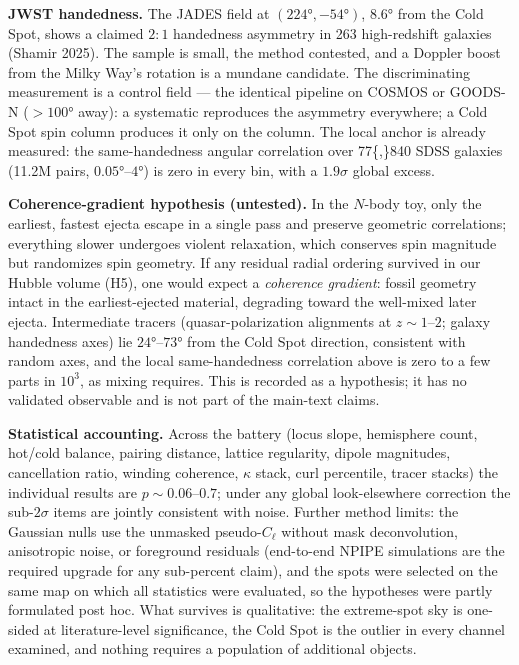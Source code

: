\documentclass[
]{article}
\begin{document}
\textbf{JWST handedness.} The JADES field at \((224°, -54°)\), \(8.6°\)
from the Cold Spot, shows a claimed \(2\!:\!1\) handedness asymmetry in
263 high-redshift galaxies (Shamir 2025). The sample is small, the
method contested, and a Doppler boost from the Milky Way's rotation is a
mundane candidate. The discriminating measurement is a control field ---
the identical pipeline on COSMOS or GOODS-N (\(> 100°\) away): a
systematic reproduces the asymmetry everywhere; a Cold Spot spin column
produces it only on the column. The local anchor is already measured:
the same-handedness angular correlation over 77\{,\}840 SDSS galaxies
(11.2M pairs, \(0.05°\)--\(4°\)) is zero in every bin, with a
\(1.9\sigma\) global excess.

\textbf{Coherence-gradient hypothesis (untested).} In the \(N\)-body
toy, only the earliest, fastest ejecta escape in a single pass and
preserve geometric correlations; everything slower undergoes violent
relaxation, which conserves spin magnitude but randomizes spin geometry.
If any residual radial ordering survived in our Hubble volume (H5), one
would expect a \emph{coherence gradient}: fossil geometry intact in the
earliest-ejected material, degrading toward the well-mixed later ejecta.
Intermediate tracers (quasar-polarization alignments at
\(z \sim 1\)--\(2\); galaxy handedness axes) lie \(24°\)--\(73°\) from
the Cold Spot direction, consistent with random axes, and the local
same-handedness correlation above is zero to a few parts in \(10^3\), as
mixing requires. This is recorded as a hypothesis; it has no validated
observable and is not part of the main-text claims.

\textbf{Statistical accounting.} Across the battery (locus slope,
hemisphere count, hot/cold balance, pairing distance, lattice
regularity, dipole magnitudes, cancellation ratio, winding coherence,
\(\kappa\) stack, curl percentile, tracer stacks) the individual results
are \(p \sim 0.06\)--\(0.7\); under any global look-elsewhere correction
the sub-\(2\sigma\) items are jointly consistent with noise. Further
method limits: the Gaussian nulls use the unmasked pseudo-\(C_\ell\)
without mask deconvolution, anisotropic noise, or foreground residuals
(end-to-end NPIPE simulations are the required upgrade for any
sub-percent claim), and the spots were selected on the same map on which
all statistics were evaluated, so the hypotheses were partly formulated
post hoc. What survives is qualitative: the extreme-spot sky is
one-sided at literature-level significance, the Cold Spot is the outlier
in every channel examined, and nothing requires a population of
additional objects.
\end{document}
